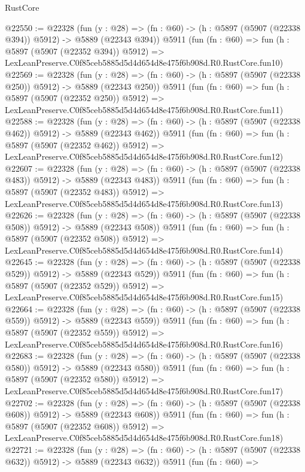 \begin{lexlean}{RustCore}
\begin{coremodule}
@22550 := @22328
    (fun (y : @28) => (fn : @60) -> (h : @5897 (@5907 (@22338 @394)) @5912) -> @5889 (@22343 @394))
    @5911
    (fun (fn : @60) =>
    fun (h : @5897 (@5907 (@22352 @394)) @5912) =>
    LexLeanPreserve.C0f85ceb5885d5d4d654d8e475f6b908d.R0.RustCore.fun10)
@22569 := @22328
    (fun (y : @28) => (fn : @60) -> (h : @5897 (@5907 (@22338 @250)) @5912) -> @5889 (@22343 @250))
    @5911
    (fun (fn : @60) =>
    fun (h : @5897 (@5907 (@22352 @250)) @5912) =>
    LexLeanPreserve.C0f85ceb5885d5d4d654d8e475f6b908d.R0.RustCore.fun11)
@22588 := @22328
    (fun (y : @28) => (fn : @60) -> (h : @5897 (@5907 (@22338 @462)) @5912) -> @5889 (@22343 @462))
    @5911
    (fun (fn : @60) =>
    fun (h : @5897 (@5907 (@22352 @462)) @5912) =>
    LexLeanPreserve.C0f85ceb5885d5d4d654d8e475f6b908d.R0.RustCore.fun12)
@22607 := @22328
    (fun (y : @28) => (fn : @60) -> (h : @5897 (@5907 (@22338 @483)) @5912) -> @5889 (@22343 @483))
    @5911
    (fun (fn : @60) =>
    fun (h : @5897 (@5907 (@22352 @483)) @5912) =>
    LexLeanPreserve.C0f85ceb5885d5d4d654d8e475f6b908d.R0.RustCore.fun13)
@22626 := @22328
    (fun (y : @28) => (fn : @60) -> (h : @5897 (@5907 (@22338 @508)) @5912) -> @5889 (@22343 @508))
    @5911
    (fun (fn : @60) =>
    fun (h : @5897 (@5907 (@22352 @508)) @5912) =>
    LexLeanPreserve.C0f85ceb5885d5d4d654d8e475f6b908d.R0.RustCore.fun14)
@22645 := @22328
    (fun (y : @28) => (fn : @60) -> (h : @5897 (@5907 (@22338 @529)) @5912) -> @5889 (@22343 @529))
    @5911
    (fun (fn : @60) =>
    fun (h : @5897 (@5907 (@22352 @529)) @5912) =>
    LexLeanPreserve.C0f85ceb5885d5d4d654d8e475f6b908d.R0.RustCore.fun15)
@22664 := @22328
    (fun (y : @28) => (fn : @60) -> (h : @5897 (@5907 (@22338 @559)) @5912) -> @5889 (@22343 @559))
    @5911
    (fun (fn : @60) =>
    fun (h : @5897 (@5907 (@22352 @559)) @5912) =>
    LexLeanPreserve.C0f85ceb5885d5d4d654d8e475f6b908d.R0.RustCore.fun16)
@22683 := @22328
    (fun (y : @28) => (fn : @60) -> (h : @5897 (@5907 (@22338 @580)) @5912) -> @5889 (@22343 @580))
    @5911
    (fun (fn : @60) =>
    fun (h : @5897 (@5907 (@22352 @580)) @5912) =>
    LexLeanPreserve.C0f85ceb5885d5d4d654d8e475f6b908d.R0.RustCore.fun17)
@22702 := @22328
    (fun (y : @28) => (fn : @60) -> (h : @5897 (@5907 (@22338 @608)) @5912) -> @5889 (@22343 @608))
    @5911
    (fun (fn : @60) =>
    fun (h : @5897 (@5907 (@22352 @608)) @5912) =>
    LexLeanPreserve.C0f85ceb5885d5d4d654d8e475f6b908d.R0.RustCore.fun18)
@22721 := @22328
    (fun (y : @28) => (fn : @60) -> (h : @5897 (@5907 (@22338 @632)) @5912) -> @5889 (@22343 @632))
    @5911
    (fun (fn : @60) =>

\end{coremodule}
\end{lexlean}
